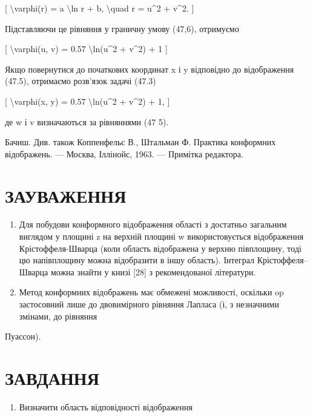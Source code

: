 \documentclass[
]{article}
\providecommand{\tightlist}{%
  \setlength{\itemsep}{0pt}\setlength{\parskip}{0pt}}
\begin{document}
{{{{[} \textbackslash varphi(r) = a \textbackslash ln r + b,
\textbackslash quad r = u\^{}2 + v\^{}2. {]}

Підставляючи це рівняння у граничну умову (47,6), отримуємо

{[} \textbackslash varphi(u, v) = 0.57 \textbackslash ln(u\^{}2 +
v\^{}2) + 1 {]}

Якщо повернутися до початкових координат x і y відповідно до
відображення (47.5), отримаємо розв'язок задачі (47.3)

{[} \textbackslash varphi(x, y) = 0.57 \textbackslash ln(u\^{}2 +
v\^{}2) + 1, {]}

де w і v визначаються за рівняннями (47 5).

Бачиш. Див. також Коппенфельс В., Штальман Ф. Практика конформних
відображень. --- Москва, Іллінойс, 1963. --- Примітка редактора.

\section{ЗАУВАЖЕННЯ}\label{ux437ux430ux443ux432ux430ux436ux435ux43dux43dux44f-8}

\begin{enumerate}
\def\labelenumi{\arabic{enumi}.}
\item
  Для побудови конформного відображення області з достатньо загальним
  виглядом у площині z на верхній площині w використовується
  відображення Крістоффеля-Шварца (коли область відображена у верхню
  півплощину, тоді цю напівплощину можна відобразити в іншу область).
  Інтеграл Крістоффеля--Шварца можна знайти у книзі {[}28{]} з
  рекомендованої літератури.
\item
  Метод конформних відображень має обмежені можливості, оскільки op
  застосовний лише до двовимірного рівняння Лапласа (і, з незначними
  змінами, до рівняння
\end{enumerate}

Пуассон).

\section{ЗАВДАННЯ}\label{ux437ux430ux432ux434ux430ux43dux43dux44f-11}

\begin{enumerate}
\def\labelenumi{\arabic{enumi}.}
\tightlist
\item
  Визначити область відповідності відображення
\end{enumerate}

}}}
\end{document}
